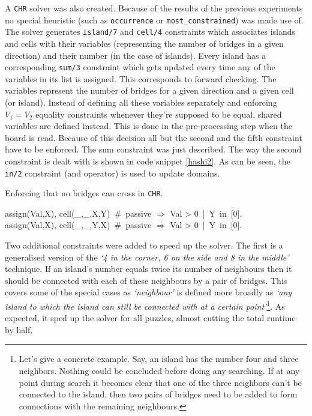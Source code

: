 A \texttt{CHR} solver was also created. Because of the results of the previous experiments no special heuristic (such as \texttt{occurrence} or \texttt{most\_constrained}) was made use of. The solver generates \texttt{island/7} and \texttt{cell/4} constraints which associates islands and cells with their variables (representing the number of bridges in a given direction) and their number (in the case of islands). Every island has a corresponding \texttt{sum/3} constraint which gets updated every time any of the variables in its list is assigned. This corresponds to forward checking. The variables represent the number of bridges for a given direction and a given cell (or island). Instead of defining all these variables separately and enforcing $V_1=V_2$ equality constraints whenever they're supposed to be equal, shared variables are defined instead. This is done in the pre-processing step when the board is read. Because of this decision all but the second and the fifth constraint have to be enforced. The sum constraint was just described. The way the second constraint is dealt with is shown in code snippet \ref{hashi2}. As can be seen, the \texttt{in/2} constraint (and operator) is used to update domains.

\begin{snippet}[H]
\caption{Enforcing that no bridges can cross in \texttt{CHR}.}\label{hashi2}
\small
assign(Val,X), cell(\_,\_,X,Y)\ \#\ passive $\Longrightarrow$ Val > 0\ |\ Y\ in\ [0].\\
assign(Val,X), cell(\_,\_,Y,X)\ \#\ passive $\Longrightarrow$ Val > 0\ |\ Y\ in\ [0].
\end{snippet}

Two additional constraints were added to speed up the solver. The first is a generalised version of the \textit{`4 in the corner, 6 on the side and 8 in the middle'} technique. If an island's number equals twice its number of neighbours then it should be connected with each of these neighbours by a pair of bridges. This covers some of the special cases as \textit{`neighbour'} is defined more broadly as  \textit{`any island to which the island can still be connected with at a certain point'}\footnote{Let's give a concrete example. Say, an island has the number four and three neighbors. Nothing could be concluded before doing any searching. If at any point during search it becomes clear that one of the three neighbors can't be connected to the island, then two pairs of bridges need to be added to form connections with the remaining neighbours.}. As expected, it sped up the solver for all puzzles, almost cutting the total runtime by half.\\\par

